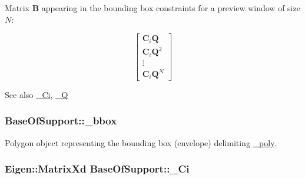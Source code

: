 \-Matrix $\mathbf{B}$ appearing in the bounding box constraints for a preview window of size $N$\-:

\[ \left[\begin{array}{c} \mathbf{C}_i\mathbf{Q}\\ \mathbf{C}_i\mathbf{Q}^2\\ \vdots\\ \mathbf{C}_i\mathbf{Q}^N \end{array}\right] \]

\begin{DoxySeeAlso}{\-See also}
\hyperlink{classBaseOfSupport_a0a7a51d0d278841633e4b291df96065d}{\-\_\-\-Ci}, \hyperlink{classBaseOfSupport_a22efc7f81862ffd1268b862ddb9d59ff}{\-\_\-\-Q} 
\end{DoxySeeAlso}
\hypertarget{classBaseOfSupport_a8af13ff0086dc08252d49f69b1752033}{
\subsubsection[{\-\_\-bbox}]{ {\bf \-Base\-Of\-Support\-::\-\_\-bbox}}}\label{classBaseOfSupport_a8af13ff0086dc08252d49f69b1752033}
\-Polygon object representing the bounding box (envelope) delimiting \hyperlink{classBaseOfSupport_a7e9b4ef515f90e2a7012871e7287bf5e}{\-\_\-poly}. \hypertarget{classBaseOfSupport_a0a7a51d0d278841633e4b291df96065d}{
\subsubsection[{\-\_\-\-Ci}]{\setlength{\rightskip}{0pt plus 5cm}\-Eigen\-::\-Matrix\-Xd {\bf \-Base\-Of\-Support\-::\-\_\-\-Ci}}}\label{classBaseOfSupport_a0a7a51d0d278841633e4b291df96065d}
